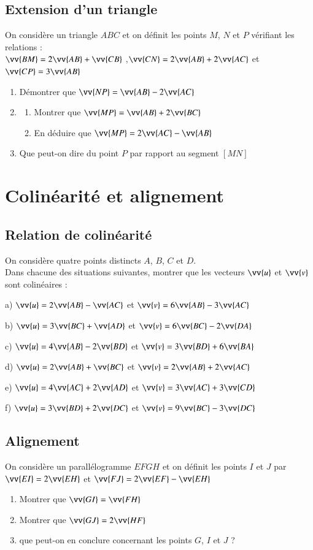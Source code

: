 \documentclass[oneside,12pt]{article}          %
\begin{document}
\subsection{Extension d'un triangle}
On considère un triangle $ABC$ et on définit les points $M$, $N$ et $P$ vérifiant les relations :\\
$\vv{BM}=2\vv{AB}+\vv{CB}$ \quad ,\quad $\vv{CN}=2\vv{AB}+2\vv{AC}$ \quad et \quad $\vv{CP}=3\vv{AB}$
\begin{enumerate}
	\item Démontrer que $\vv{NP}=\vv{AB}-2\vv{AC}$
	\item \begin{enumerate}
		\item Montrer que $\vv{MP}=\vv{AB}+2\vv{BC}$
		\item En déduire que $\vv{MP}=2\vv{AC}-\vv{AB}$
	\end{enumerate}
	\item Que peut-on dire du point $P$ par rapport au segment $[MN]$
\end{enumerate}



\section{Colinéarité et alignement}

\subsection{Relation de colinéarité}
On considère quatre points distincts $A$, $B$, $C$ et $D$.\\
Dans chacune des situations suivantes, montrer que les vecteurs $\vv{u}$ et $\vv{v}$ sont colinéaires :

a) $\vv{u}=2\vv{AB}-\vv{AC}$ \qquad et \qquad $\vv{v}=6\vv{AB}-3\vv{AC}$

b) $\vv{u}=3\vv{BC}+\vv{AD}$ \qquad et \qquad $\vv{v}=6\vv{BC}-2\vv{DA}$

c) $\vv{u}=4\vv{AB}-2\vv{BD}$ \qquad et \qquad $\vv{v}=3\vv{BD}+6\vv{BA}$

d) $\vv{u}=2\vv{AB}+\vv{BC}$ \qquad et \qquad $\vv{v}=2\vv{AB}+2\vv{AC}$

e) $\vv{u}=4\vv{AC}+2\vv{AD}$ \qquad et \qquad $\vv{v}=3\vv{AC}+3\vv{CD}$

f) $\vv{u}=3\vv{BD}+2\vv{DC}$ \qquad et \qquad $\vv{v}=9\vv{BC}-3\vv{DC}$ 



\subsection{Alignement}
On considère un parallélogramme $EFGH$ et on définit les points $I$ et $J$ par  $\vv{EI}=2\vv{EH}$ et $\vv{FJ}=2\vv{EF}-\vv{EH}$
\begin{enumerate}
	\item Montrer que $\vv{GI}=\vv{FH}$
	\item Montrer que $\vv{GJ}=2\vv{HF}$
	\item que peut-on en conclure concernant les points $G$, $I$ et $J$ ?
\end{enumerate}
\end{document}
